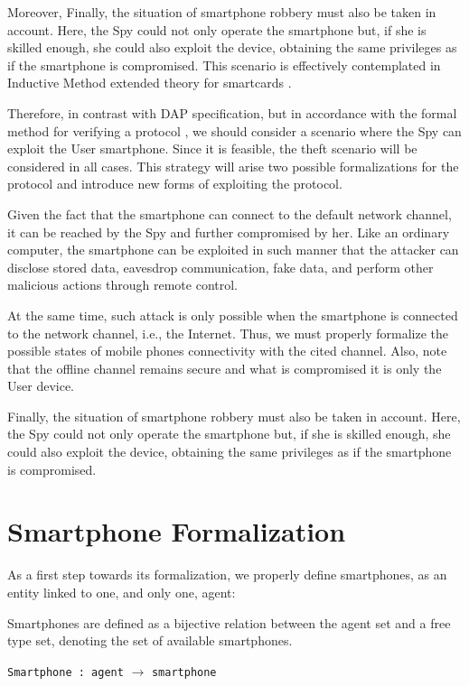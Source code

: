 Moreover, Finally, the situation of smartphone robbery must also be taken in account. Here, the Spy could not only operate the smartphone but, if she is skilled enough, she could also exploit the device, obtaining the same privileges as if the smartphone is compromised. This scenario is effectively contemplated in Inductive Method extended theory for smartcards \cite[Ch. 10]{Bella2007}.

Therefore, in contrast with DAP specification, but in accordance with the formal method for verifying a protocol \cite[Ch. 11]{Bella2007}, we should consider a scenario where the Spy can exploit the User smartphone. Since it is feasible, the theft scenario will be considered in all cases. This strategy will arise two possible formalizations for the protocol and introduce new forms of exploiting the protocol. 

Given the fact that the smartphone can connect to the default network channel, it can be reached by the Spy and further compromised by her. Like an ordinary computer, the smartphone can be exploited in such manner that the attacker can disclose stored data, eavesdrop communication, fake data, and perform other malicious actions through remote control.

At the same time, such attack is only possible when the smartphone is connected to the network channel, i.e., the Internet. Thus, we must properly formalize the possible states of mobile phones connectivity with the cited channel. Also, note that the offline channel remains secure and what is compromised it is only the User device.

Finally, the situation of smartphone robbery must also be taken in account. Here, the Spy could not only operate the smartphone but, if she is skilled enough, she could also exploit the device, obtaining the same privileges as if the smartphone is compromised.



\section{Smartphone Formalization}
As a first step towards its formalization, we properly define smartphones, as an entity linked to one, and only one, agent:

\begin{definition}
  Smartphones are defined as a bijective relation between the agent set and a free type set, denoting the set of available smartphones.
  \begin{center}
    \texttt{Smartphone : agent} $\longrightarrow$ \texttt{smartphone}
  \end{center}
\end{definition}

